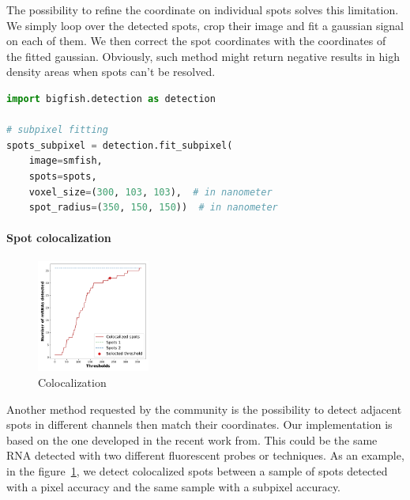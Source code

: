 The possibility to refine the coordinate on individual spots solves this limitation.
We simply loop over the detected spots, crop their image and fit a gaussian signal on each of them.
We then correct the spot coordinates with the coordinates of the fitted gaussian.
Obviously, such method might return negative results in high density areas when spots can't be resolved.\\

\begin{minipage}{0.9\textwidth}
\begin{lstlisting}[language=Python]
import bigfish.detection as detection

# subpixel fitting
spots_subpixel = detection.fit_subpixel(
    image=smfish,
    spots=spots,
    voxel_size=(300, 103, 103),  # in nanometer
    spot_radius=(350, 150, 150))  # in nanometer
\end{lstlisting}
\end{minipage}

\paragraph{Spot colocalization}

\begin{figure}
	\begin{center}
		\includegraphics[width=0.33\textwidth]{figures/chapter2/colocalization_elbow}
	\caption{Colocalization}
	\label{fig:elbow_colocalization}
	\end{center}
\end{figure}

Another method requested by the community is the possibility to detect adjacent spots in different channels then match their coordinates.
Our implementation is based on the one developed in the recent work from\cite{CORNES_2022}.
This could be the same \ac{RNA} detected with two different fluorescent probes or techniques.
As an example, in the figure~\ref{fig:elbow_colocalization}, we detect colocalized spots between a sample of spots detected with a pixel accuracy and the same sample with a subpixel accuracy.

